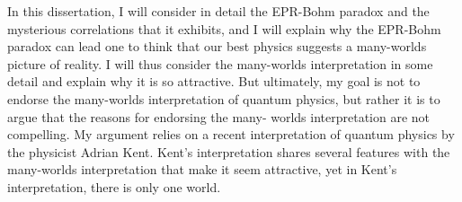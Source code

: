 \documentclass[12pt]{report}
\begin{document}
\vspace{12.96pt} %
 In this dissertation, I will consider in detail the EPR-Bohm paradox and the mysterious correlations that it exhibits, and I will explain why the EPR-Bohm paradox can lead one to think that our best physics suggests a many-worlds picture of reality. I will thus consider the many-worlds interpretation in some detail and explain why it is so attractive. But ultimately, my goal is not to endorse the many-worlds interpretation of quantum physics, but rather it is to argue that the reasons for endorsing the many- worlds interpretation are not compelling. My argument relies on a recent interpretation of quantum physics by the physicist Adrian Kent. Kent's interpretation shares several features with the many-worlds interpretation that make it seem attractive, yet in Kent's interpretation, there is only one world.




\pagebreak

\end{document}
